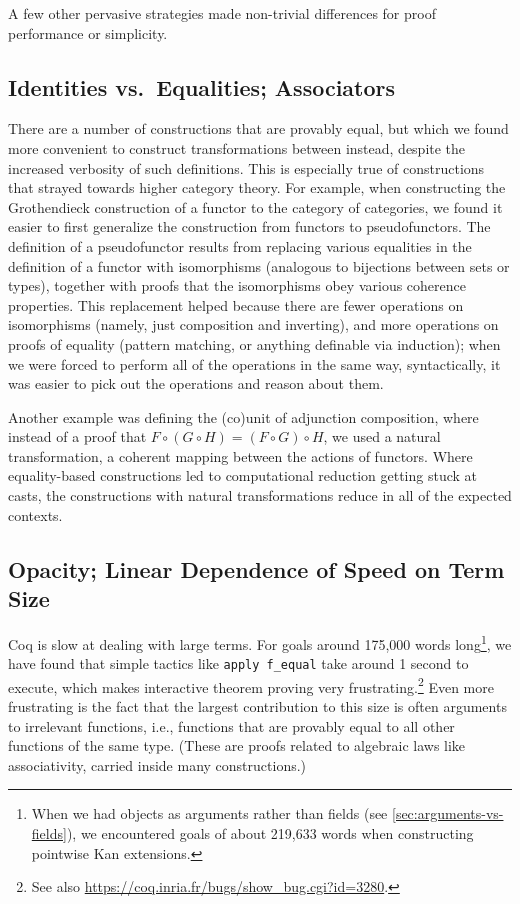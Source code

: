 A few other pervasive strategies made non-trivial differences for proof performance or simplicity.

  \subsection{Identities vs.\ Equalities; Associators} \label{sec:associators}
    There are a number of constructions that are provably equal, but which we found more convenient to construct transformations between instead, despite the increased verbosity of such definitions.
    This is especially true of constructions that strayed towards higher category theory.
    For example, when constructing the Grothendieck construction of a functor to the category of categories, we found it easier to first generalize the construction from functors to pseudofunctors.
    The definition of a pseudofunctor results from replacing various equalities in the definition of a functor with isomorphisms (analogous to bijections between sets or types), together with proofs that the isomorphisms obey various coherence properties.
    This replacement helped because there are fewer operations on isomorphisms (namely, just composition and inverting), and more operations on proofs of equality (pattern matching, or anything definable via induction); when we were forced to perform all of the operations in the same way, syntactically, it was easier to pick out the operations and reason about them.

    Another example was defining the (co)unit of adjunction composition, where instead of a proof that $F \circ (G \circ H) = (F \circ G) \circ H$, we used a natural transformation, a coherent mapping between the actions of functors.
    Where equality-based constructions led to computational reduction getting stuck at casts, the constructions with natural transformations reduce in all of the expected contexts.

  \subsection{Opacity; Linear Dependence of Speed on Term Size}\label{sec:equality-reflection}\label{sec:term-size}

    Coq is slow at dealing with large terms.
    For goals around 175,000 words long\footnote{When we had objects as arguments rather than fields (see \autoref{sec:arguments-vs-fields}), we encountered goals of about 219,633 words when constructing pointwise Kan extensions.}, we have found that simple tactics like \texttt{apply f\_equal} take around 1 second to execute, which makes interactive theorem proving very frustrating.\footnote{See also \url{https://coq.inria.fr/bugs/show\_bug.cgi?id=3280}.}
    Even more frustrating is the fact that the largest contribution to this size is often arguments to irrelevant functions, i.e., functions that are provably equal to all other functions of the same type.
    (These are proofs related to algebraic laws like associativity, carried inside many constructions.)

